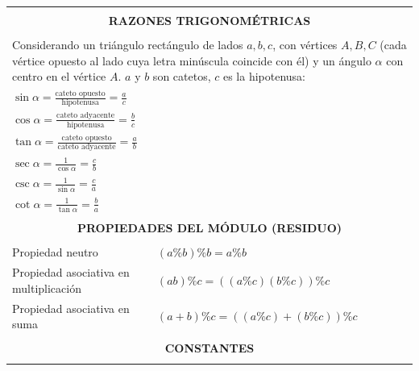 \begin{center}
{\begin{tabular}{|p{}|p{}|}
\multicolumn{2}{|c|}{} \\
\multicolumn{2}{|c|}{\textbf{RAZONES TRIGONOMÉTRICAS}} \\
\multicolumn{2}{|c|}{} \\ \hline

\multicolumn{2}{|p{0.96\columnwidth}|}{Considerando un triángulo rectángulo de lados $a,b,c$, con vértices $A,B,C$ (cada vértice opuesto al lado cuya letra minúscula coincide con él) y un ángulo $\alpha$ con centro en el vértice $A$. $a$ y $b$ son catetos, $c$ es la hipotenusa:} \\ \hline

\multicolumn{2}{|p{0.96\columnwidth}|}{$\displaystyle \sin\alpha = \frac{\text{cateto opuesto}}{\text{hipotenusa}} = \frac{a}{c}$} \\ \hline
\multicolumn{2}{|p{0.96\columnwidth}|}{$\displaystyle \cos\alpha = \frac{\text{cateto adyacente}}{\text{hipotenusa}} = \frac{b}{c}$} \\ \hline
\multicolumn{2}{|p{0.96\columnwidth}|}{$\displaystyle \tan\alpha = \frac{\text{cateto opuesto}}{\text{cateto adyacente}} = \frac{a}{b}$} \\ \hline
\multicolumn{2}{|p{0.96\columnwidth}|}{$\displaystyle \sec\alpha = \frac{1}{\cos\alpha} = \frac{c}{b}$} \\ \hline
\multicolumn{2}{|p{0.96\columnwidth}|}{$\displaystyle \csc\alpha = \frac{1}{\sin\alpha} = \frac{c}{a}$} \\ \hline
\multicolumn{2}{|p{0.96\columnwidth}|}{$\displaystyle \cot\alpha = \frac{1}{\tan\alpha} = \frac{b}{a}$} \\ \hline

\multicolumn{2}{|c|}{} \\
\multicolumn{2}{|c|}{\textbf{PROPIEDADES DEL MÓDULO (RESIDUO)}} \\
\multicolumn{2}{|c|}{} \\ \hline

Propiedad neutro & $(a \% b) \% b = a \% b$ \\ \hline
Propiedad asociativa en multiplicación & $(ab) \% c = ((a \% c)(b \% c)) \% c$ \\ \hline
Propiedad asociativa en suma & $(a + b) \% c = ((a \% c) + (b \% c)) \% c$ \\ \hline

\multicolumn{2}{|c|}{} \\
\multicolumn{2}{|c|}{\textbf{CONSTANTES}} \\
\multicolumn{2}{|c|}{} \\ \hline


\end{tabular}}
\end{center}
